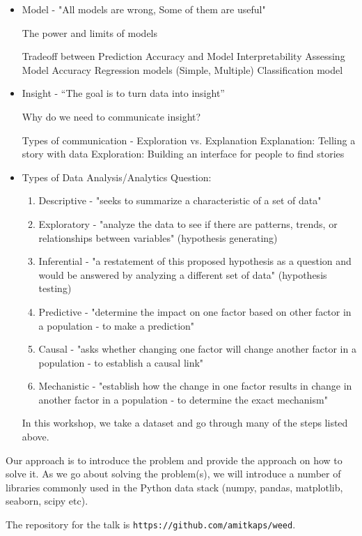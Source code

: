 \begin{description}
\begin{itemize}
\item Model - "All models are wrong, Some of them are useful"

The power and limits of models

Tradeoff between Prediction Accuracy and Model Interpretability Assessing Model Accuracy Regression models (Simple, Multiple) Classification model

\item Insight - “The goal is to turn data into insight”

Why do we need to communicate insight?

Types of communication - Exploration vs. Explanation Explanation: Telling a story with data Exploration: Building an interface for people to find stories

\item Types of Data Analysis/Analytics Question:

\begin{enumerate}
   \item Descriptive - "seeks to summarize a characteristic of a set of data"
   \item Exploratory - "analyze the data to see if there are patterns, trends, or relationships between variables" (hypothesis generating)
   \item Inferential - "a restatement of this proposed hypothesis as a question and would be answered by analyzing a different set of data" (hypothesis testing)
   \item Predictive - "determine the impact on one factor based on other factor in a population - to make a prediction"
   \item Causal - "asks whether changing one factor will change another factor in a population - to establish a causal link"
   \item Mechanistic - "establish how the change in one factor results in change in another factor in a population - to determine the exact mechanism"
\end{enumerate}
In this workshop, we take a dataset and go through many of the steps listed above.
\end{itemize}
Our approach is to introduce the problem and provide the approach on how to solve it. As we go about solving the problem(s), we will introduce a number of libraries commonly used in the Python data stack (numpy, pandas, matplotlib, seaborn, scipy etc).

The repository for the talk is \verb+https://github.com/amitkaps/weed+.


\end{description}

